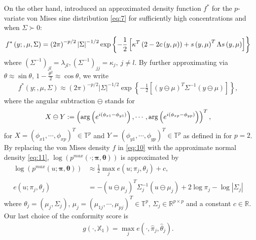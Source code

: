 On the other hand, \citet{Mardia:2012} introduced an approximated density function $f^*$ for the $p$-variate von Mises sine distribution \eqref{eq:7} for sufficiently high concentrations and when $\Sigma\succ0$:
\begin{align}\notag
f^*\left(y;,\mu,\Sigma\right) = \left(2\pi\right)^{-p/2}\left|\Sigma\right|^{-1/2}\exp\left\{-\frac{1}{2}\left[\kappa^T\left(2 - 2c\left(y,\mu\right)\right)+s\left(y,\mu\right)^T\Lambda s\left(y,\mu\right)\right]\right\}
\end{align}
where $\left(\Sigma^{-1}\right)_{jl} = \lambda_{jl}, \left(\Sigma^{-1}\right)_{jj} = \kappa_j, ~j\ne l$. By further approximating via $\theta \approx \sin\theta$, $1-\frac{\theta^2}{2}\approx\cos\theta$, we write
\begin{align}
    f^*\left(y;,\mu,\Sigma\right) \approx \left(2\pi\right)^{-p/2}\left|\Sigma\right|^{-1/2}\exp\left\{-\frac{1}{2}\left[\left(y\ominus\mu\right)^T\Sigma^{-1}\left(y\ominus\mu\right)\right]\right\},\label{eq:11}
\end{align}
where the angular subtraction $\ominus$ stands for
\begin{align}\notag
X\ominus Y := \left(\arg\left(e^{i\left(\phi_{x1} - \phi_{y1}\right)}\right), \cdots, \arg\left(e^{i\left(\phi_{xp} - \phi_{yp}\right)}\right)\right)^T,
\end{align}
for $X = \left(\phi_{x1},\cdots,\phi_{xp}\right)^T\in\mathbb{T}^p$ and $Y = \left(\phi_{y1},\cdots,\phi_{yp}\right)^T\in\mathbb{T}^p$ as defined in \citet{Jung:2021} for $p = 2$. By replacing the von Mises density $f$ in \eqref{eq:10} with the approximate normal density \eqref{eq:11}, $\log\left(p^{max}\left(\cdot;\boldsymbol{\pi},\boldsymbol{\theta}\right)\right)$ is approximated by
\begin{align}
    \log\left(p^{max}\left(u;\boldsymbol{\pi},\boldsymbol{\theta}\right)\right) &\approx \frac{1}{2}\max_j e\left(u;\pi_j,\theta_j\right) + c, \nonumber\\
    e\left(u;\pi_j,\theta_j\right)&=-\left(u\ominus\mu_j\right)^T\Sigma_j^{-1}\left(u\ominus\mu_j\right) +2\log\pi_j-\log\left|\Sigma_j\right| \label{eq:ehatj}
\end{align}
where $\theta_j=(\mu_{j},\Sigma_j)$, $\mu_j = (\mu_{1j},\cdots,\mu_{pj})^T\in\mathbb{T}^p$, $\Sigma_j\in\mathbb{R}^{p\times p}$ and a constant $c\in\mathbb{R}$. Our last choice of the conformity score is
\begin{align}\label{eq:12}
g\left(\cdot,\mathbb{X}_{1}\right)=\max_je\left(\cdot,\hat{\pi}_j,\hat{\theta}_j\right).
\end{align}
